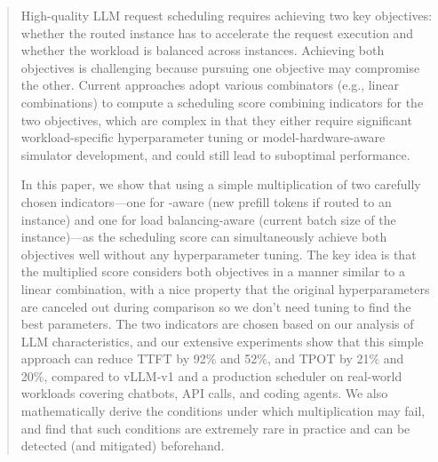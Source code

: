\begin{abstract}
    \noindent
High-quality LLM request scheduling requires
achieving two key objectives: whether the routed instance has
{\kvcache} to accelerate the request execution and whether
the workload is balanced across instances.
Achieving both objectives is challenging because
pursuing one objective may compromise the other.
Current approaches adopt various combinators (e.g., linear combinations)
to compute a scheduling score combining indicators for the two objectives,
which are complex in that they either require significant workload-specific hyperparameter tuning
or model-hardware-aware simulator development,
and could still lead to suboptimal performance.

In this paper, we show that using a simple multiplication of two carefully chosen indicators---one 
for {\kvcache}-aware (new prefill tokens if routed to an instance) and one for load balancing-aware 
(current batch size of the instance)---as the scheduling score
can simultaneously achieve both objectives well without any hyperparameter tuning.
The key idea is that the multiplied score considers both objectives in a manner similar to a linear combination,
with a nice property that the original hyperparameters are canceled out during comparison 
so we don't need tuning to find the best parameters.  
The two indicators are chosen based on our analysis of LLM characteristics, 
and our extensive experiments show that this simple approach can reduce TTFT by 92\% and 52\%, and TPOT by 21\% and 20\%, 
compared to vLLM-v1 and a production scheduler on real-world workloads covering chatbots, API calls, 
and coding agents.
We also mathematically derive the conditions under which multiplication may fail, 
and find that such conditions are extremely rare in practice and 
can be detected (and mitigated) beforehand.

\end{abstract}
